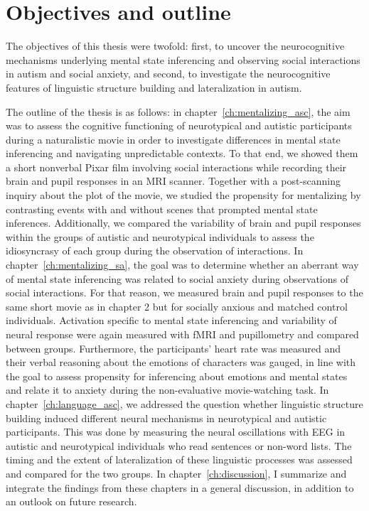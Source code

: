 \section{Objectives and outline}

The objectives of this thesis were twofold: first, to uncover the neurocognitive mechanisms underlying mental state inferencing and observing social interactions in autism and social anxiety, and second, to investigate the neurocognitive features of linguistic structure building and lateralization in autism. 

The outline of the thesis is as follows: in chapter~\ref{ch:mentalizing_asc}, the aim was to assess the cognitive functioning of neurotypical and autistic participants during a naturalistic movie in order to investigate differences in mental state inferencing and navigating unpredictable contexts. To that end, we showed them a short nonverbal Pixar film involving social interactions while recording their brain and pupil responses in an MRI scanner. Together with a post-scanning inquiry about the plot of the movie, we studied the propensity for mentalizing by contrasting events with and without scenes that prompted mental state inferences. Additionally, we compared the variability of brain and pupil responses within the groups of autistic and neurotypical individuals to assess the idiosyncrasy of each group during the observation of interactions. In chapter~\ref{ch:mentalizing_sa}, the goal was to determine whether an aberrant way of mental state inferencing was related to social anxiety during observations of social interactions. For that reason, we measured brain and pupil responses to the same short movie as in chapter 2 but for socially anxious and matched control individuals. Activation specific to mental state inferencing and variability of neural response were again measured with fMRI and pupillometry and compared between groups. Furthermore, the participants' heart rate was measured and their verbal reasoning about the emotions of characters was gauged, in line with the goal to assess propensity for inferencing about emotions and mental states and relate it to anxiety during the non-evaluative movie-watching task. In chapter~\ref{ch:language_asc}, we addressed the question whether linguistic structure building induced different neural mechanisms in neurotypical and autistic participants. This was done by measuring the neural oscillations with EEG in autistic and neurotypical individuals who read sentences or non-word lists. The timing and the extent of lateralization of these linguistic processes was assessed and compared for the two groups. In chapter~\ref{ch:discussion}, I summarize and integrate the findings from these chapters in a general discussion, in addition to an outlook on future research.
